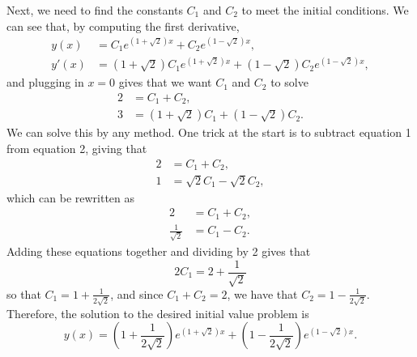 \documentclass{ximera}
\begin{document}
\begin{exampleSol}
    Next, we need to find the constants $C_1$ and $C_2$ to meet the initial conditions. We can see that, by computing the first derivative,
    \begin{equation*}
        \begin{split}
            y(x) &= C_1e^{(1+\sqrt{2})x} + C_2e^{(1 - \sqrt{2})x}, \\
            y'(x) &= (1+\sqrt{2})C_1e^{(1+\sqrt{2})x} + (1 - \sqrt{2})C_2e^{(1 - \sqrt{2})x},
        \end{split}
    \end{equation*}
    and plugging in $x=0$ gives that we want $C_1$ and $C_2$ to solve
    \begin{equation*}
        \begin{split}
            2 &= C_1 + C_2, \\
            3 &= (1 + \sqrt{2})C_1 + (1 - \sqrt{2})C_2.
        \end{split}
    \end{equation*}
    We can solve this by any method. One trick at the start is to subtract equation 1 from equation 2, giving that
    \begin{equation*}
        \begin{split}
            2 &= C_1 + C_2, \\
            1 &= \sqrt{2}C_1 - \sqrt{2}C_2,
        \end{split}
    \end{equation*}
    which can be rewritten as
    \begin{equation*}
        \begin{split}
            2 &= C_1 + C_2, \\
            \frac{1}{\sqrt{2}} &= C_1 - C_2.
        \end{split}
    \end{equation*}
    Adding these equations together and dividing by 2 gives that
    \begin{equation*}
        2C_1 = 2 + \frac{1}{\sqrt{2}}
    \end{equation*}
    so that $C_1 = 1 + \frac{1}{2\sqrt{2}}$, and since $C_1 + C_2 = 2$, we have that $C_2 = 1 - \frac{1}{2\sqrt{2}}$. Therefore, the solution to the desired initial value problem is
    \begin{equation*}
        y(x) = \left(1 + \frac{1}{2\sqrt{2}}\right)e^{(1 + \sqrt{2})x} + \left(1 - \frac{1}{2\sqrt{2}}\right)e^{(1 - \sqrt{2})x}.
    \end{equation*}
\end{exampleSol}
\end{document}
